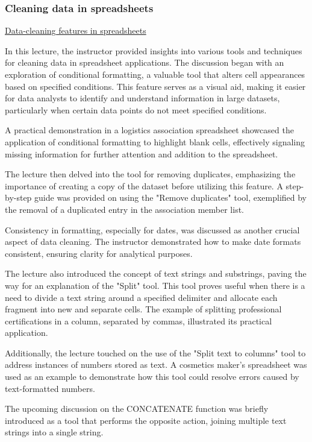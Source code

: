 \documentclass[]{article}
\begin{document}
\subsubsection{Cleaning data in spreadsheets}

\uline{Data-cleaning features in spreadsheets}

In this lecture, the instructor provided insights into various tools and techniques for cleaning data in spreadsheet applications. The discussion began with an exploration of conditional formatting, a valuable tool that alters cell appearances based on specified conditions. This feature serves as a visual aid, making it easier for data analysts to identify and understand information in large datasets, particularly when certain data points do not meet specified conditions.

A practical demonstration in a logistics association spreadsheet showcased the application of conditional formatting to highlight blank cells, effectively signaling missing information for further attention and addition to the spreadsheet.

The lecture then delved into the tool for removing duplicates, emphasizing the importance of creating a copy of the dataset before utilizing this feature. A step-by-step guide was provided on using the "Remove duplicates" tool, exemplified by the removal of a duplicated entry in the association member list.

Consistency in formatting, especially for dates, was discussed as another crucial aspect of data cleaning. The instructor demonstrated how to make date formats consistent, ensuring clarity for analytical purposes.

The lecture also introduced the concept of text strings and substrings, paving the way for an explanation of the "Split" tool. This tool proves useful when there is a need to divide a text string around a specified delimiter and allocate each fragment into new and separate cells. The example of splitting professional certifications in a column, separated by commas, illustrated its practical application.

Additionally, the lecture touched on the use of the "Split text to columns" tool to address instances of numbers stored as text. A cosmetics maker's spreadsheet was used as an example to demonstrate how this tool could resolve errors caused by text-formatted numbers.

The upcoming discussion on the CONCATENATE function was briefly introduced as a tool that performs the opposite action, joining multiple text strings into a single string.
\end{document}
